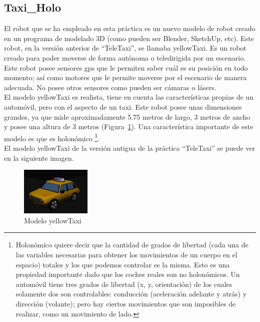 \subsection{Taxi\_Holo}
El robot que se ha empleado en esta práctica es un nuevo modelo de robot creado en un programa de modelado 3D (como pueden ser Blender, SketchUp, etc). Este robot, en la versión anterior de ``TeleTaxi'', se llamaba yellowTaxi. Es un robot creado para poder moverse de forma autónoma o teledirigida por un escenario. Este robot posee sensores \acrshort{gps} que le permiten saber cuál es su posición en todo momento; así como motores que le permite moverse por el escenario de manera adecuada. No posee otros sensores como pueden ser cámaras o lásers.\\

El modelo yellowTaxi es realista, tiene en cuenta las características propias de un automóvil, pero con el aspecto de un taxi. Este robot posee unas dimensiones grandes, ya que mide aproximadamente 5.75 metros de largo, 3 metros de ancho y posee una altura de 3 metros (Figura~\ref{fig.teleTaxi}).  Una característica importante de este modelo es que es  holonómico \footnote{Holonómico quiere decir que la cantidad de grados de libertad (cada una de las variables necesarias para obtener los movimientos de un cuerpo en el espacio) totales y los que podemos controlar es la misma. Esto es una propiedad importante dado que los coches reales son no holonómicos. Un automóvil tiene tres grados de libertad (x, y, orientación) de los cuales solamente dos son controlables: conducción (aceleración adelante y atrás) y dirección (volante); pero hay ciertos movimientos que son imposibles de realizar, como un movimiento de lado.}.\\

El modelo yellowTaxi de la versión antigua de la práctica ``TeleTaxi'' se puede ver en la siguiente imagen.


\begin{figure}[H]
  \begin{center}
    \includegraphics[width=0.3\textwidth]{figures/GPP/gpp_teleTaxi.png}
		\caption{Modelo yellowTaxi}
		\label{fig.teleTaxi}
		\end{center}
\end{figure}

